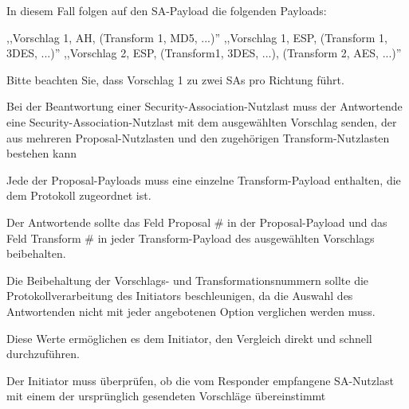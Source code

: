 \documentclass[a4paper]{article}
\begin{document}
\begin{multicols}{3}
\begin{itemize*}
\begin{itemize*}
                  \item In diesem Fall folgen auf den SA-Payload die folgenden Payloads:
                  \begin{itemize*}
                        \item ,,Vorschlag 1, AH, (Transform 1, MD5, ...)'' ,,Vorschlag 1, ESP, (Transform 1, 3DES, ...)'' ,,Vorschlag 2, ESP, (Transform1, 3DES, ...), (Transform 2, AES, ...)''
                  \end{itemize*}
                  \item Bitte beachten Sie, dass Vorschlag 1 zu zwei SAs pro Richtung führt.
            \end{itemize*}
            \item Bei der Beantwortung einer Security-Association-Nutzlast muss der Antwortende eine Security-Association-Nutzlast mit dem ausgewählten Vorschlag senden, der aus mehreren Proposal-Nutzlasten und den zugehörigen Transform-Nutzlasten bestehen kann
            \item Jede der Proposal-Payloads muss eine einzelne Transform-Payload enthalten, die dem Protokoll zugeordnet ist.
            \item Der Antwortende sollte das Feld Proposal \# in der Proposal-Payload und das Feld Transform \# in jeder Transform-Payload des ausgewählten Vorschlags beibehalten.
            \begin{itemize*}
                  \item Die Beibehaltung der Vorschlags- und Transformationsnummern sollte die Protokollverarbeitung des Initiators beschleunigen, da die Auswahl des Antwortenden nicht mit jeder angebotenen Option verglichen werden muss.
                  \item Diese Werte ermöglichen es dem Initiator, den Vergleich direkt und schnell durchzuführen.
            \end{itemize*}
            \item Der Initiator muss überprüfen, ob die vom Responder empfangene SA-Nutzlast mit einem der ursprünglich gesendeten Vorschläge übereinstimmt
      \end{itemize*}


\end{multicols}
\end{document}
